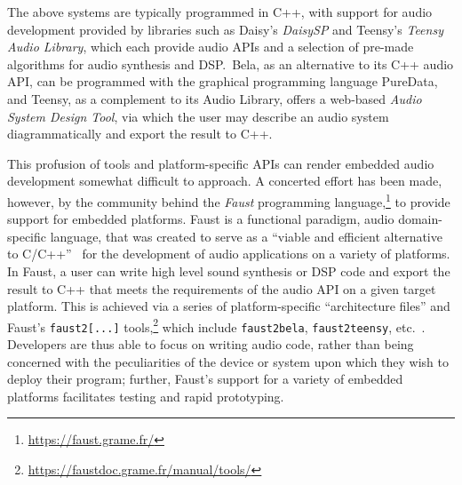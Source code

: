 \documentclass[utf8]{FrontiersinHarvard}
\begin{document}
    The above systems are typically programmed in C++, with support for audio
    development provided by libraries such as Daisy's \textit{DaisySP} and Teensy's
    \textit{Teensy Audio Library}, which each provide audio APIs and a selection of
    pre-made algorithms for audio synthesis and DSP.\
    Bela, as an alternative to its C++ audio API, can be programmed with the
    graphical programming language PureData, and Teensy, as a complement to its
    Audio Library, offers a web-based \textit{Audio System Design Tool}, via which
    the user may describe an audio system diagrammatically and export the result to
    C++.

    This profusion of tools and platform-specific APIs can render embedded audio
    development somewhat difficult to approach.
    A concerted effort has been made, however, by the community behind the
    \textit{Faust} programming language,\footnote{\url{https://faust.grame.fr/}} to
    provide support for embedded platforms.
    Faust is a functional paradigm, audio domain-specific language, that was created
    to serve as a ``viable and efficient alternative to
    C/C++''~\citep{orlarey_faust_2009} for the development of audio applications on
    a variety of platforms.
    In Faust, a user can write high level sound synthesis or DSP code and export the
    result to C++ that meets the requirements of the audio API on a given target
    platform.
    This is achieved via a series of platform-specific ``architecture files'' and
    Faust's \texttt{faust2[...]} tools,\footnote{
        \url{https://faustdoc.grame.fr/manual/tools/}
    } which include
    \texttt{faust2bela}, \texttt{faust2teensy}, etc.~\citep{michon_real_2019,
        michon_embedded_2020}.
    Developers are thus able to focus on writing audio code, rather than being
    concerned with the peculiarities of the device or system upon which they wish
    to deploy their program;
    further, Faust's support for a variety of embedded platforms facilitates testing
    and rapid prototyping.
\end{document}
